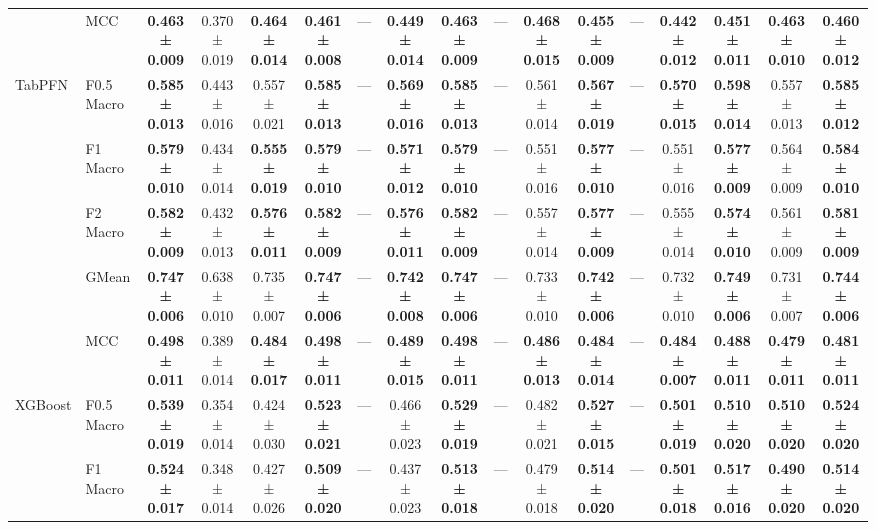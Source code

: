 \begin{table}[H]
{\begin{tabular}{llccccccccccccccc}
 & MCC & \textbf{0.463 ± 0.009} & 0.370 ± 0.019 & \textbf{0.464 ± 0.014} & \textbf{0.461 ± 0.008} & — & \textbf{0.449 ± 0.014} & \textbf{0.463 ± 0.009} & — & \textbf{0.468 ± 0.015} & \textbf{0.455 ± 0.009} & — & \textbf{0.442 ± 0.012} & \textbf{0.451 ± 0.011} & \textbf{0.463 ± 0.010} & \textbf{0.460 ± 0.012} \\
\cline{1-17}
\multirow[t]{5}{*}{TabPFN} & F0.5 Macro & \textbf{0.585 ± 0.013} & 0.443 ± 0.016 & 0.557 ± 0.021 & \textbf{0.585 ± 0.013} & — & \textbf{0.569 ± 0.016} & \textbf{0.585 ± 0.013} & — & 0.561 ± 0.014 & \textbf{0.567 ± 0.019} & — & \textbf{0.570 ± 0.015} & \textbf{0.598 ± 0.014} & 0.557 ± 0.013 & \textbf{0.585 ± 0.012} \\
 & F1 Macro & \textbf{0.579 ± 0.010} & 0.434 ± 0.014 & \textbf{0.555 ± 0.019} & \textbf{0.579 ± 0.010} & — & \textbf{0.571 ± 0.012} & \textbf{0.579 ± 0.010} & — & 0.551 ± 0.016 & \textbf{0.577 ± 0.010} & — & 0.551 ± 0.016 & \textbf{0.577 ± 0.009} & 0.564 ± 0.009 & \textbf{0.584 ± 0.010} \\
 & F2 Macro & \textbf{0.582 ± 0.009} & 0.432 ± 0.013 & \textbf{0.576 ± 0.011} & \textbf{0.582 ± 0.009} & — & \textbf{0.576 ± 0.011} & \textbf{0.582 ± 0.009} & — & 0.557 ± 0.014 & \textbf{0.577 ± 0.009} & — & 0.555 ± 0.014 & \textbf{0.574 ± 0.010} & 0.561 ± 0.009 & \textbf{0.581 ± 0.009} \\
 & GMean & \textbf{0.747 ± 0.006} & 0.638 ± 0.010 & 0.735 ± 0.007 & \textbf{0.747 ± 0.006} & — & \textbf{0.742 ± 0.008} & \textbf{0.747 ± 0.006} & — & 0.733 ± 0.010 & \textbf{0.742 ± 0.006} & — & 0.732 ± 0.010 & \textbf{0.749 ± 0.006} & 0.731 ± 0.007 & \textbf{0.744 ± 0.006} \\
 & MCC & \textbf{0.498 ± 0.011} & 0.389 ± 0.014 & \textbf{0.484 ± 0.017} & \textbf{0.498 ± 0.011} & — & \textbf{0.489 ± 0.015} & \textbf{0.498 ± 0.011} & — & \textbf{0.486 ± 0.013} & \textbf{0.484 ± 0.014} & — & \textbf{0.484 ± 0.007} & \textbf{0.488 ± 0.011} & \textbf{0.479 ± 0.011} & \textbf{0.481 ± 0.011} \\
\cline{1-17}
\multirow[t]{5}{*}{XGBoost} & F0.5 Macro & \textbf{0.539 ± 0.019} & 0.354 ± 0.014 & 0.424 ± 0.030 & \textbf{0.523 ± 0.021} & — & 0.466 ± 0.023 & \textbf{0.529 ± 0.019} & — & 0.482 ± 0.021 & \textbf{0.527 ± 0.015} & — & \textbf{0.501 ± 0.019} & \textbf{0.510 ± 0.020} & \textbf{0.510 ± 0.020} & \textbf{0.524 ± 0.020} \\
 & F1 Macro & \textbf{0.524 ± 0.017} & 0.348 ± 0.014 & 0.427 ± 0.026 & \textbf{0.509 ± 0.020} & — & 0.437 ± 0.023 & \textbf{0.513 ± 0.018} & — & 0.479 ± 0.018 & \textbf{0.514 ± 0.020} & — & \textbf{0.501 ± 0.018} & \textbf{0.517 ± 0.016} & \textbf{0.490 ± 0.020} & \textbf{0.514 ± 0.020} \\

\end{tabular}}
\end{table}
